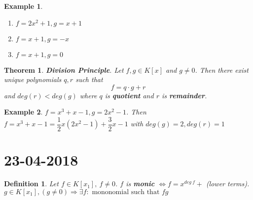 \documentclass[a4paper,10pt]{article}
\newtheorem{theo}{Theorem}
\newtheorem{defi}{Definition}
\newtheorem{ex}{Example}
\begin{document}
\begin{ex}
	\begin{enumerate}
		\item $ f=2x^2 +1 , g =x+1 $
		\item  $ f=x+1, g=-x $
		\item  $ f=x+1, g =0 $
	\end{enumerate}
\end{ex}

\begin{theo}
	\textbf{Division Principle}. Let $ f,g \in K[x] $ and $ g \neq 0 $. Then there exist unique polynomials $ q,r $ such that
	\[ f= q \cdot g + r  \] and $ deg(r) < deg(g) $ where $ q $ is \textbf{quotient} and $ r $ is \textbf{remainder}.
\end{theo}

\begin{ex}
	$ f = x^3 +x -1 , g =2x^2 -1 $. Then $ f = x^3+x-1 = \dfrac{1}{2} x (2x^2-1) + \dfrac{3}{2}x -1 $ with $ deg(g)=2 , deg(r)=1 $
\end{ex}

\newpage
\section{23-04-2018}

\begin{defi}
	Let $ f \in K[x_{1}] , \  f\neq 0 $. $ f $ is \textbf{monic} $ \Leftrightarrow f = x^{deg \ f} + $ (lower terms).\\
	$ g \in K[x_{1}], (g\neq 0) \Rightarrow \exists f : \text{ mononomial such that } f  g $
\end{defi}
\end{document}
